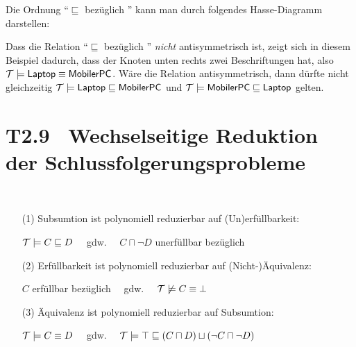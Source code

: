 \documentclass[fontsize=11pt, twoside=false, numbers=autoenddot]{scrbook}
\begin{document}
Die Ordnung "`$\sqsubseteq$ bezüglich \Tmc{}"' kann man durch folgendes Hasse-Diagramm darstellen:
%
\begin{center}
\end{center}
%
Dass die Relation "`$\sqsubseteq$ bezüglich \Tmc{}"' \emph{nicht} antisymmetrisch ist,
zeigt sich in diesem Beispiel dadurch, dass der Knoten unten rechts zwei Beschriftungen hat,
also $\mathcal{T} \models \textsf{Laptop} \equiv \textsf{MobilerPC}$.
Wäre die Relation antisymmetrisch, dann dürfte nicht gleichzeitig
$\mathcal{T} \models \textsf{Laptop} \sqsubseteq \textsf{MobilerPC}$
und $\mathcal{T} \models \textsf{MobilerPC} \sqsubseteq \textsf{Laptop}$ gelten.

\newcommand{\Interreduktionen}{T2.9}
\section*{\hypertarget{Interreduktionen}{\Interreduktionen}~ Wechselseitige Reduktion der Schlussfolgerungsprobleme}

~
\begin{enumerate}
  \item[(1)]
    Subsumtion ist polynomiell reduzierbar auf (Un)erfüllbarkeit:
    \par\smallskip
    $\mathcal{T} \models C \sqsubseteq D$ ~~gdw.~~ $C \sqcap \neg D$ unerfüllbar bezüglich \Tmc
    \par\smallskip
  \item[(2)]
    Erfüllbarkeit ist polynomiell reduzierbar auf (Nicht-)Äquivalenz:
    \par\smallskip
    $C$ erfüllbar bezüglich \Tmc ~~gdw.~~ $\mathcal{T} \not\models C \equiv \bot$
    \par\smallskip
  \item[(3)]
    Äquivalenz ist polynomiell reduzierbar auf Subsumtion:
    \par\smallskip
    $\mathcal{T} \models C \equiv D$ ~~gdw.~~ $\mathcal{T} \models \top \sqsubseteq (C \sqcap D) \sqcup (\neg C \sqcap \neg D)$
\end{enumerate}
\end{document}
